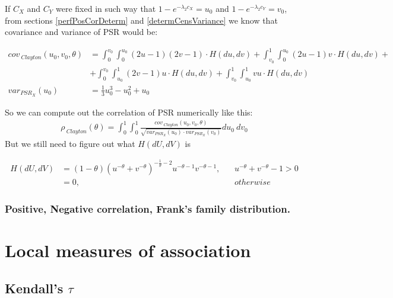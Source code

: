 \documentclass[]{article}
\begin{document}
If $C_X$ and $C_Y$ were fixed in such way that $1 - e^{- \lambda_2 c_X} = u_0$ and $1 - e^{- \lambda_2 c_Y} = v_0$,  from sections \ref{perfPosCorDeterm} and \ref{determCensVariance} we know that covariance and variance of PSR would be:

	$$
	\begin{aligned}
    cov_{~Clayton}(u_0, v_0, \theta) &= \int_0^{v_0}\int_0^{u_0} (2u - 1)(2v - 1)\cdot H(du, dv) + \int_{v_0}^{1}\int_0^{u_0} (2u - 1)v\cdot H(du, dv) + \\
    &+\int_{0}^{v_0}\int_{u_0}^1 (2v - 1)u\cdot H(du, dv) + \int_{v_0}^{1}\int_{u_0}^1 vu\cdot H(du, dv)\\
    var_{PSR_X}(u_0)&= \frac{1}{3} u_0^3 - u_0^2 + u_0
	\end{aligned}
	$$

So we can compute out the correlation of PSR numerically like this:
	$$
  \begin{aligned}
      \rho_{~Clayton}(\theta) = \int_0^1\int_0^1  \frac{cov_{~Clayton}(u_0, v_0, \theta)}{\sqrt{var_{PSR_X}(u_0)\cdot var_{PSR_X}(v_0)}} du_0 ~dv_0
  \end{aligned}
	$$
But we still need to figure out what $H(dU, dV)$ is

	$$
  \begin{aligned}
      H(dU, dV) &= (1 - \theta) \left(  u^{-\theta} + v^{-\theta}  \right) ^{-\frac{1}{\theta} - 2} u^{-\theta - 1} v^{-\theta - 1},~~~~ & u^{-\theta} + v^{-\theta} - 1 >0\\
        &= 0, &{otherwise}
  \end{aligned}
	$$



\subsubsection{Positive, Negative correlation, Frank's family distribution.}




\section{Local measures of association}
\subsection{Kendall's $\tau$}
\end{document}
